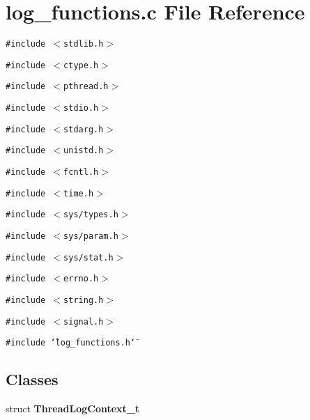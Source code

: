 \section{log\_\-functions.c File Reference}
\label{log__functions_8c}
{\tt \#include $<$stdlib.h$>$}\par
{\tt \#include $<$ctype.h$>$}\par
{\tt \#include $<$pthread.h$>$}\par
{\tt \#include $<$stdio.h$>$}\par
{\tt \#include $<$stdarg.h$>$}\par
{\tt \#include $<$unistd.h$>$}\par
{\tt \#include $<$fcntl.h$>$}\par
{\tt \#include $<$time.h$>$}\par
{\tt \#include $<$sys/types.h$>$}\par
{\tt \#include $<$sys/param.h$>$}\par
{\tt \#include $<$sys/stat.h$>$}\par
{\tt \#include $<$errno.h$>$}\par
{\tt \#include $<$string.h$>$}\par
{\tt \#include $<$signal.h$>$}\par
{\tt \#include \char`\"{}log\_\-functions.h\char`\"{}}\par
\subsection*{Classes}
\begin{CompactItemize}
\item 
struct {\bf ThreadLogContext\_\-t}
\end{CompactItemize}
